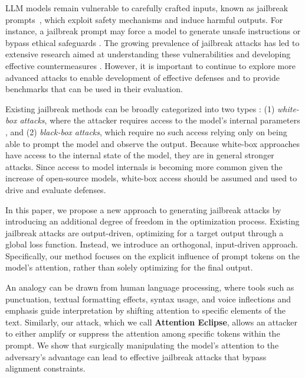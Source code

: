 LLM models remain vulnerable to carefully crafted inputs, known as jailbreak prompts~\cite{shayegani2023survey}, which exploit safety mechanisms and induce harmful outputs. For instance, a jailbreak prompt may force a model to generate unsafe instructions or bypass ethical safeguards \cite{deng2023jailbreaker,mamun2023deepmem}. The growing prevalence of jailbreak attacks has led to extensive research aimed at understanding these vulnerabilities and developing effective countermeasures \cite{jin2024jailbreakzoo}.  However, it is important to continue to explore more advanced attacks to enable development of effective defenses and to provide benchmarks that can be used in their evaluation.

Existing jailbreak methods can be broadly categorized into two types \cite{jin2024jailbreakzoo}: (1) \textit{white-box attacks}, where the attacker requires access to the model's internal parameters \cite{zou2023universal, wallace2019universal, wen2024hard, guo2021gradient, liu2023autodan}, and (2) \textit{black-box attacks}, which require no such access relying only on being able to prompt the model and observe the output\cite{chao2023jailbreaking, mehrotra2312tree, li2023deepinception, perez2022ignore, greshake2023not, zeng2024johnny, shen2024anything, wei2024jailbroken}.  Because white-box approaches have access to the internal state of the model, they are in general stronger attacks.  Since access to model internals is becoming more common given the increase of open-source models,  white-box access should be assumed and used to drive and evaluate defenses.


In this paper, we propose a new approach to generating jailbreak attacks by introducing an additional degree of freedom in the optimization process. Existing jailbreak attacks are output-driven, optimizing for a target output through a global loss function. Instead, we introduce an orthogonal, input-driven approach. Specifically, our method focuses on the explicit influence of prompt tokens on the model's attention, rather than solely optimizing for the final output.

An analogy can be drawn from human language processing, where tools such as punctuation, textual formatting effects, syntax usage, and voice inflections and emphasis guide interpretation by shifting attention to specific elements of the text. Similarly, our attack, which we call \textbf{Attention Eclipse}, allows an attacker to either amplify or suppress the attention among specific tokens within the prompt. We show that surgically manipulating the model’s attention to the adversary’s advantage can lead to effective jailbreak attacks that bypass alignment constraints. %
 
